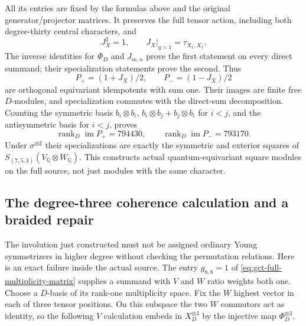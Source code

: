 All its entries are fixed by the formulas above and the original
generator/projector matrices. It preserves the full tensor action,
including both degree-thirty central characters, and
\[
 J_X^2=1,\qquad J_X|_{q=1}=\tau_{X_1,X_1}.
\]
The inverse identities for $\Phi_D$ and $J_{m,n}$ prove the first
statement on every direct summand; their specialization statements
prove the second. Thus
\begin{equation}\label{eq:qt-square-projectors}
 P_+=(1+J_X)/2,\qquad P_-=(1-J_X)/2
\end{equation}
are orthogonal equivariant idempotents with sum one. Their images
are finite free $D$-modules, and specialization commutes with the
direct-sum decomposition. Counting the symmetric basis
$b_i\otimes b_i$, $b_i\otimes b_j+b_j\otimes b_i$ for $i<j$,
and the antisymmetric basis for $i<j$, proves
\[
 \operatorname{rank}_D\operatorname{im}P_+=794430,
 \qquad\operatorname{rank}_D\operatorname{im}P_-=793170.
\]
Under $\sigma^{\otimes2}$ their specializations are exactly the
symmetric and exterior squares of
$S_{(7,5,3)}(V_{\mathbb Q}\otimes W_{\mathbb Q})$.
This constructs actual quantum-equivariant square modules on the
full source, not just modules with the same character.

\subsection{The degree-three coherence calculation and a braided repair}

The involution just constructed must not be assigned ordinary Young
symmetrizers in higher degree without checking the permutation
relations. Here is an exact failure inside the actual source.
The entry $g_{8,8}=1$ of
\eqref{eq:gct-full-multiplicity-matrix} supplies a summand with
$V$ and $W$ ratio weights both one. Choose a $D$-basis of its
rank-one multiplicity space. Fix the $W$ highest vector in each
of three tensor positions. On this subspace the two $W$ commutors
act as identity, so the following $V$ calculation embeds in
$X_D^{\otimes3}$ by the injective map $\Phi_D^{\otimes3}$.

